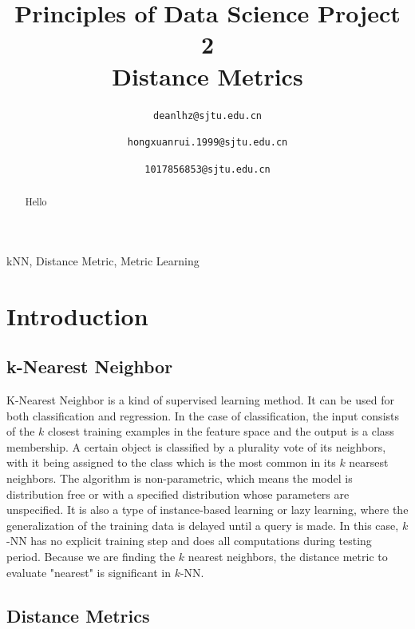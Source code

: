 \documentclass[conference]{IEEEtran}
\begin{document}


\title{Principles of Data Science Project 2\\
Distance Metrics}

\author{
\texttt{deanlhz@sjtu.edu.cn}
\and
{}
\texttt{hongxuanrui.1999@sjtu.edu.cn}
\and
{}
\texttt{1017856853@sjtu.edu.cn}
}

\maketitle

\begin{abstract}
Hello
\end{abstract}

\begin{IEEEkeywords}
kNN, Distance Metric, Metric Learning
\end{IEEEkeywords}

\section{Introduction}
\subsection{k-Nearest Neighbor}
K-Nearest Neighbor is a kind of supervised learning method. It can be used for both classification and regression.
In the case of classification, the input consists of the $k$ closest training examples in the feature space and the output is a class membership.
A certain object is classified by a plurality vote of its neighbors, with it being assigned to the class which is the most common in its $k$ nearsest neighbors.
The algorithm is non-parametric\cite{knn}, which means the model is distribution free or with a specified distribution whose parameters are unspecified.
It is also a type of instance-based learning or lazy learning, where the generalization of the training data is delayed until a query is made. In this case, $k$-NN has no explicit 
training step and does all computations during testing period. Because we are finding the $k$ nearest neighbors, the distance metric to evaluate "nearest" is significant in $k$-NN.
\subsection{Distance Metrics}
\end{document}
